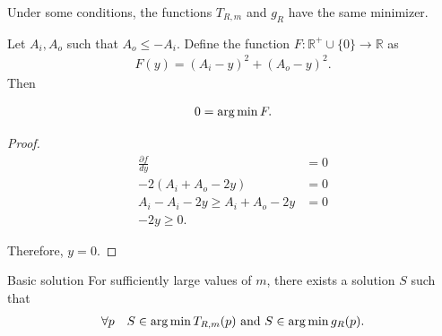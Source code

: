 Under some conditions, the functions $T_{R,m}$ and $g_R$ have the same minimizer. 

\begin{lemma}
	Let $A_i,A_o$ such that $A_o \leq -A_i$. Define the function $F:\mathbb{R^+}\cup\{0\}\rightarrow \mathbb{R}$ as
	\begin{align*}
		F(y) = (A_i-y)^2 + (A_o - y)^2.
	\end{align*}
	Then 
	
	\begin{align*}
		0=\operatorname*{arg\,min} F.
	\end{align*}
	
\begin{proof}
	\begin{align*}
		\frac{\partial  f}{dy} &= 0 \\
		-2(A_i+A_o-2y) &= 0 \\
		A_i - A_i - 2y \geq A_i + A_o - 2y &= 0\\
		-2y \geq 0.
	\end{align*}
	
	Therefore, $y=0$.
\end{proof}
\end{lemma}


\begin{claim}{Basic solution}
	For sufficiently large values of $m$, there exists a solution $S$ such that
\begin{align*}
	\forall p \quad S \in \operatorname*{arg\,min} T_{R,m}(p) \text{ and } S \in \operatorname*{arg\,min} g_R(p).
\end{align*}

\end{claim}

